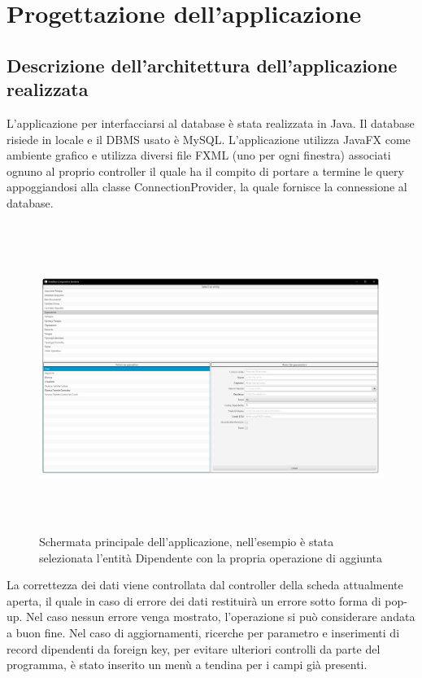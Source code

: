 \documentclass[a4paper, 12pt]{report}
\begin{document}
\chapter{Progettazione dell’applicazione}

\section{Descrizione dell’architettura dell’applicazione realizzata}
L'applicazione per interfacciarsi al database è stata realizzata in Java. Il database risiede in locale e il DBMS usato è MySQL.
L'applicazione utilizza JavaFX come ambiente grafico e utilizza diversi file FXML (uno per ogni finestra) associati ognuno
al proprio controller il quale ha il compito di portare a termine le query appoggiandosi alla classe ConnectionProvider, la 
quale fornisce la connessione al database.

\begin{figure}[H]
        \centering
        \includegraphics[height=10cm]{img/schermataPrincipaleApp.png}
        \caption{Schermata principale dell'applicazione, nell'esempio è stata selezionata l'entità Dipendente 
        con la propria operazione di aggiunta}
\end{figure}
\noindent
La correttezza dei dati viene controllata dal controller della scheda attualmente aperta, il quale in caso di errore dei dati
restituirà un errore sotto forma di pop-up. Nel caso nessun errore venga mostrato, l'operazione si può considerare
andata a buon fine.
\newpage
\noindent
Nel caso di aggiornamenti, ricerche per parametro e inserimenti di record dipendenti da foreign key, per evitare ulteriori controlli 
da parte del programma, è stato inserito un menù a tendina per i campi già presenti.
\end{document}

